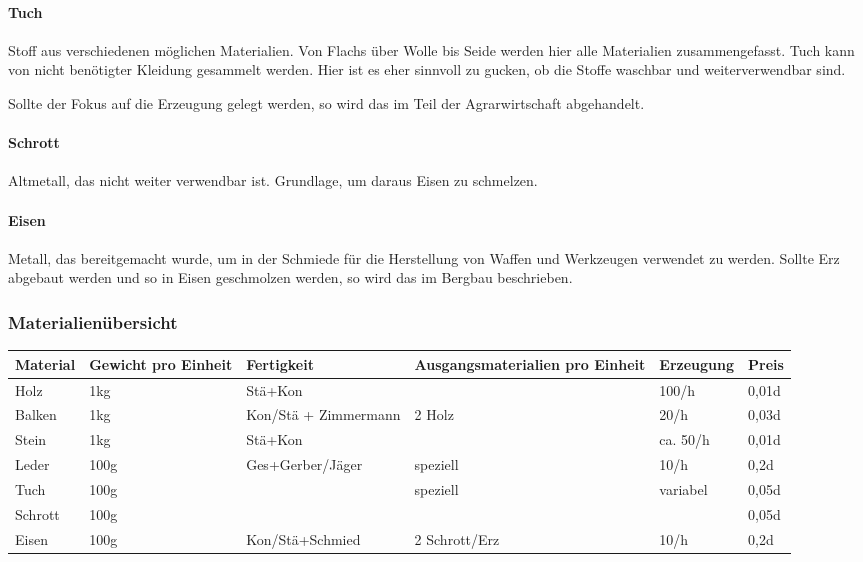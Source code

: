 \documentclass{article}
\begin{document}
\paragraph{Tuch}

Stoff aus verschiedenen möglichen Materialien. Von Flachs über Wolle bis Seide werden hier alle Materialien
zusammengefasst. Tuch kann von nicht benötigter Kleidung gesammelt werden. Hier ist es eher sinnvoll zu gucken,
ob die Stoffe waschbar und weiterverwendbar sind.

Sollte der Fokus auf die Erzeugung gelegt werden, so wird das im Teil der Agrarwirtschaft abgehandelt.

\paragraph{Schrott}

Altmetall, das nicht weiter verwendbar ist. Grundlage, um daraus Eisen zu schmelzen.

\paragraph{Eisen}

Metall, das bereitgemacht wurde, um in der Schmiede für die Herstellung von Waffen und Werkzeugen verwendet zu werden.
Sollte Erz abgebaut werden und so in Eisen geschmolzen werden, so wird das im Bergbau beschrieben.

\subsubsection{Materialienübersicht}


\begin{small}
\begin{tabular}{|m{15mm}|m{20mm}|m{4cm}|m{35mm}|m{2cm}|m{1cm}|}
\hline
\textbf{Material}&\textbf{Gewicht pro Einheit}&\textbf{Fertigkeit}&\textbf{Ausgangsmaterialien pro Einheit}&\textbf{Erzeugung}&\textbf{Preis}\\
\hline
\hline
Holz&1kg&Stä+Kon&&100/h&0,01d\\
\hline
Balken&1kg&Kon/Stä + Zimmermann&2 Holz&20/h&0,03d\\
\hline
Stein&1kg&Stä+Kon&&ca. 50/h&0,01d\\
\hline
Leder&100g&Ges+Gerber/Jäger&speziell&10/h&0,2d\\
\hline
Tuch&100g&&speziell&variabel&0,05d\\
\hline
Schrott&100g&&&&0,05d\\
\hline
Eisen&100g&Kon/Stä+Schmied&2 Schrott/Erz&10/h&0,2d\\
\hline
\end{tabular}
\end{small}
\end{document}
